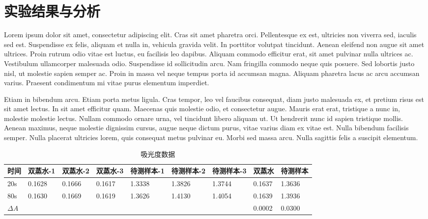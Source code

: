 \documentclass{math201}
\begin{document}
\section{实验结果与分析}

Lorem ipsum dolor sit amet, consectetur adipiscing elit. Cras sit amet pharetra orci. Pellentesque ex est, ultricies non viverra sed, iaculis sed est. Suspendisse ex felis, aliquam et nulla in, vehicula gravida velit. In porttitor volutpat tincidunt. Aenean eleifend non augue sit amet ultrices. Proin rutrum odio vitae est luctus, eu facilisis leo dapibus. Aliquam commodo efficitur erat, sit amet pulvinar nulla ultrices ac. Vestibulum ullamcorper malesuada odio. Suspendisse id sollicitudin arcu. Nam fringilla commodo neque quis posuere. Sed lobortis justo nisl, ut molestie sapien semper ac. Proin in massa vel neque tempus porta id accumsan magna. Aliquam pharetra lacus ac arcu accumsan varius. Praesent condimentum mi vitae purus elementum imperdiet.

Etiam in bibendum arcu. Etiam porta metus ligula. Cras tempor, leo vel faucibus consequat, diam justo malesuada ex, et pretium risus est sit amet lectus. In sit amet efficitur quam. Maecenas quis molestie odio, et consectetur augue. Mauris erat erat, tristique a nunc in, molestie molestie lectus. Nullam commodo ornare urna, vel tincidunt libero aliquam ut. Ut hendrerit nunc id sapien tristique mollis. Aenean maximus, neque molestie dignissim cursus, augue neque dictum purus, vitae varius diam ex vitae est. Nulla bibendum facilisis semper. Nulla placerat ultricies lorem, quis consequat metus pulvinar eu. Morbi sed massa arcu. Nulla sagittis felis a suscipit elementum.

\begin{table}[!htbp]
    \begin{center}
        \begin{tabular}{lllllllll}
            \toprule
            时间 & 双蒸水-1 & 双蒸水-2 & 双蒸水-3 & 待测样本-1 & 待测样本-2 & 待测样本-3 & 双蒸水 & 待测样本  \\
            \midrule
            20s  & 0.1628 & 0.1666 & 0.1617 & 1.3338 & 1.3826 & 1.3744 & 0.1637 & 1.3636  \\
            80s  & 0.1630 & 0.1669 & 0.1619 & 1.3626 & 1.4130 & 1.4054 & 0.1639 & 1.3936 \\
            $\Delta A$  &  &  &  &  &  &  & 0.0002 & 0.0300 \\
            \bottomrule
        \end{tabular}
    \end{center}
    \caption{吸光度数据}
    \label{fig:dist}
\end{table}
\end{document}
